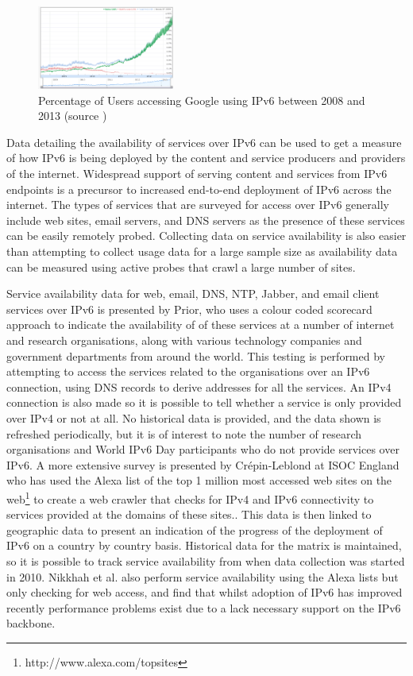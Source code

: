 \begin{figure}[htb]
\centering
\includegraphics[width=0.4\textwidth]{img/v6-google-access.png}
\caption{Percentage of Users accessing Google using IPv6 between 2008 and 2013
(source \protect\cite{google_inc._statistics:_2013})}
\label{fig:google-access}
\end{figure}

Data detailing the availability of services over IPv6 can be used to get a
measure of how IPv6 is being deployed by the content and service producers and
providers of the internet. Widespread support of serving content and services
from IPv6 endpoints is a precursor to increased end-to-end deployment of IPv6
across the internet. The types of services that are surveyed for access over
IPv6 generally include web sites, email servers, and DNS servers
as the presence of these services can be easily remotely probed. Collecting data
on service availability is also easier than attempting to collect usage data
for a large sample size as availability data can be measured using active probes
that crawl a large number of sites.

Service availability data for web, email, DNS, NTP, Jabber, and email client
services over IPv6 is presented by Prior, who uses a colour coded scorecard
approach to indicate the availability of of these services at a number of
internet and research organisations, along with various technology companies and
government departments from around the world\cite{prior_ipv6_2012}. This testing is performed by
attempting to access the services related to the organisations over an IPv6
connection, using DNS records to derive addresses for all the services. An IPv4
connection is also made so it is possible to tell whether a service is only
provided over IPv4 or not at all. No historical data is provided, and the data
shown is refreshed periodically, but it is of interest to note the number of
research organisations and World IPv6 Day participants who do not provide
services over IPv6. A more extensive survey is presented by Crépin-Leblond at
ISOC England who has used the Alexa list of the top 1 million most accessed web
sites on the web\footnote[2]{http://www.alexa.com/topsites}
to create a web crawler that checks for IPv4 and IPv6 connectivity to services provided
at the domains of these sites.\cite{olivier_mj_crepin-leblond_ipv6_2010}. This
data is then linked to geographic data to present an indication of the progress
of the deployment of IPv6 on a country by country basis.
Historical data for the matrix is maintained, so it is possible to track service
availability from when data collection was started in 2010. Nikkhah et al. also
perform service availability using the Alexa lists but only checking for
web access, and find that whilst adoption of IPv6 has improved recently
performance problems exist due to a lack necessary support on the IPv6
backbone\cite{nikkhah_assessing_2011}.

